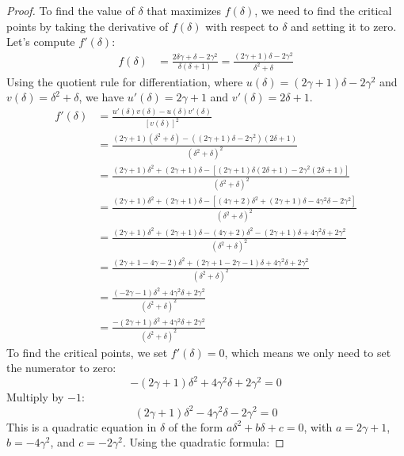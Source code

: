 \begin{proof}
To find the value of $\delta$ that maximizes $f(\delta)$, we need to find the critical points by taking the derivative of $f(\delta)$ with respect to $\delta$ and setting it to zero. Let's compute $f'(\delta)$:
\begin{align*}
    f(\delta) &= \frac{2 \delta \gamma + \delta - 2 \gamma^{2}}{\delta \left(\delta + 1\right)} = \frac{(2\gamma + 1)\delta - 2\gamma^2}{\delta^2 + \delta}
\end{align*}
Using the quotient rule for differentiation, where $u(\delta) = (2\gamma + 1)\delta - 2\gamma^2$ and $v(\delta) = \delta^2 + \delta$, we have $u'(\delta) = 2\gamma + 1$ and $v'(\delta) = 2\delta + 1$.
\begin{align*}
    f'(\delta) &= \frac{u'(\delta)v(\delta) - u(\delta)v'(\delta)}{[v(\delta)]^2} \\
    &= \frac{(2\gamma + 1)(\delta^2 + \delta) - ((2\gamma + 1)\delta - 2\gamma^2)(2\delta + 1)}{(\delta^2 + \delta)^2} \\
    &= \frac{(2\gamma + 1)\delta^2 + (2\gamma + 1)\delta - [(2\gamma + 1)\delta(2\delta + 1) - 2\gamma^2(2\delta + 1)]}{(\delta^2 + \delta)^2} \\
    &= \frac{(2\gamma + 1)\delta^2 + (2\gamma + 1)\delta - [(4\gamma + 2)\delta^2 + (2\gamma + 1)\delta - 4\gamma^2\delta - 2\gamma^2]}{(\delta^2 + \delta)^2} \\
    &= \frac{(2\gamma + 1)\delta^2 + (2\gamma + 1)\delta - (4\gamma + 2)\delta^2 - (2\gamma + 1)\delta + 4\gamma^2\delta + 2\gamma^2}{(\delta^2 + \delta)^2} \\
    &= \frac{(2\gamma + 1 - 4\gamma - 2)\delta^2 + (2\gamma + 1 - 2\gamma - 1)\delta + 4\gamma^2\delta + 2\gamma^2}{(\delta^2 + \delta)^2} \\
    &= \frac{(-2\gamma - 1)\delta^2 + 4\gamma^2\delta + 2\gamma^2}{(\delta^2 + \delta)^2} \\
    &= \frac{-(2\gamma + 1)\delta^2 + 4\gamma^2\delta + 2\gamma^2}{(\delta^2 + \delta)^2}
\end{align*}
To find the critical points, we set $f'(\delta) = 0$, which means we only need to set the numerator to zero:
\begin{equation}
    -(2\gamma + 1)\delta^2 + 4\gamma^2\delta + 2\gamma^2 = 0
\end{equation}
Multiply by $-1$:
\begin{equation}
    (2\gamma + 1)\delta^2 - 4\gamma^2\delta - 2\gamma^2 = 0
\end{equation}
This is a quadratic equation in $\delta$ of the form $a\delta^2 + b\delta + c = 0$, with $a = 2\gamma + 1$, $b = -4\gamma^2$, and $c = -2\gamma^2$. Using the quadratic formula:

\end{proof}
